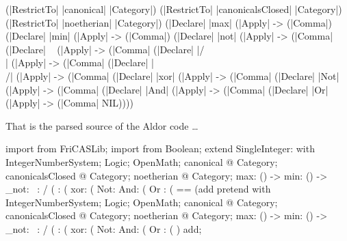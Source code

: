 \documentclass{article}
\begin{document}
\begin{code}
                                   (|RestrictTo| |canonical|
                                    |Category|)
                                   (|RestrictTo| |canonicalsClosed|
                                    |Category|)
                                   (|RestrictTo| |noetherian|
                                    |Category|)
                                   (|Declare| |max|
                                    (|Apply| -> (|Comma|) %
                                   (|Declare| |min|
                                    (|Apply| -> (|Comma|) %
                                   (|Declare| |not|
                                    (|Apply| -> (|Comma| %
                                   (|Declare| ~
                                    (|Apply| -> (|Comma| %
                                   (|Declare| |/\\|
                                    (|Apply| -> (|Comma| %
                                   (|Declare| |\\/|
                                    (|Apply| -> (|Comma| %
                                   (|Declare| |xor|
                                    (|Apply| -> (|Comma| %
                                   (|Declare| |Not|
                                    (|Apply| -> (|Comma| %
                                   (|Declare| |And|
                                    (|Apply| -> (|Comma| %
                                   (|Declare| |Or|
                                    (|Apply| -> (|Comma| %
                   NIL))))
\end{code}
That is the parsed source of the Aldor code \ldots
\begin{code}
import from FriCASLib;
import from Boolean;
extend SingleInteger: with {
        IntegerNumberSystem;
        Logic;
        OpenMath;
        canonical @ Category;
        canonicalsClosed @ Category;
        noetherian @ Category;
        max: () -> %
        min: () -> %
        _not: %
        ~:   %
        /\:  (%
        \/:  (%
        xor: (%
        Not: %
        And: (%
        Or : (%
}
 == (add pretend with {
        IntegerNumberSystem;
        Logic;
        OpenMath;
        canonical @ Category;
        canonicalsClosed @ Category;
        noetherian @ Category;
        max: () -> %
        min: () -> %
        _not: %
        ~:   %
        /\:  (%
        \/:  (%
        xor: (%
        Not: %
        And: (%
        Or : (%
}) add;
\end{code}
\end{document}
